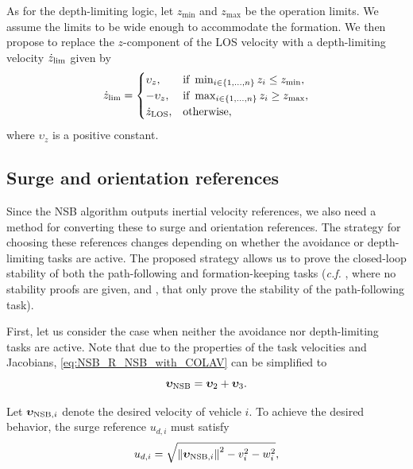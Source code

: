 As for the depth-limiting logic,
let $z_{\min}$ and $z_{\max}$ be the operation limits.
We assume the limits to be wide enough to accommodate the formation.
We then propose to replace the $z$-component of the LOS velocity with a depth-limiting velocity $\dot{z}_{\rm lim}$ given by 
\begin{equation}
    \dot{z}_{\rm lim} = \begin{cases}
        \upsilon_z, & \text{if } \min_{i \in \{1, \ldots, n\}} z_i \leq z_{\min}, \\
        -\upsilon_z, & \text{if } \max_{i \in \{1, \ldots, n\}} z_i \geq z_{\max}, \\
        \dot{z}_{\rm LOS}, & \text{otherwise},
    \end{cases}
\end{equation}
where $\upsilon_z$ is a positive constant.


\subsection{Surge and orientation references}
\label{sec:NSB_R_references}

Since the NSB algorithm outputs inertial velocity references, we also need a method for converting these to surge and orientation references.
The strategy for choosing these references changes depending on whether the avoidance or depth-limiting tasks are active.
The proposed strategy allows us to prove the closed-loop stability of both the path-following and formation-keeping tasks (\emph{c.f.} \cite{arrichiello_formation_2006}, where no stability proofs are given, and \cite{eek_formation_2021,matouvs_formation_2022}, that only prove the stability of the path-following task).



First, let us consider the case when neither the avoidance nor depth-limiting tasks are active.
Note that due to the properties of the task velocities and Jacobians, \eqref{eq:NSB_R_NSB_with_COLAV} can be simplified to 
\begin{equation}
    \bm{\upsilon}_{\rm NSB} = \bm{\upsilon}_2 + \bm{\upsilon}_3.
    \label{eq:NSB_R_NSB_nominal_simplified}
\end{equation}


\noindent Let $\bm{\upsilon}_{{\rm NSB}, i}$ denote the desired velocity of vehicle $i$.    
To achieve the desired behavior, the surge reference $u_{d, i}$ must satisfy 
\begin{equation}
    u_{d, i} = \sqrt{\left\|\bm{\upsilon}_{{\rm NSB}, i}\right\|^2 - v_i^2 - w_i^2},
    \label{eq:NSB_R_surge_reference}
\end{equation}


